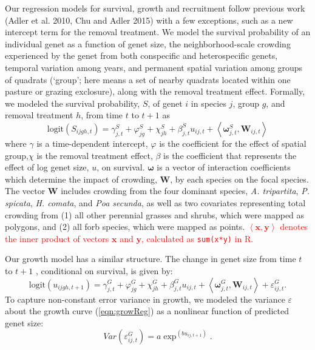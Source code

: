 \documentclass[11pt]{article}
\newcommand{\new}{\textcolor{red}}
\begin{document}
\begin{doublespacing}
Our regression models for survival, growth and recruitment follow previous work (Adler et al. 2010, Chu and Adler 2015) with a few exceptions, such as a new intercept term for the removal treatment. We model the survival probability of an individual genet as a function of genet size, the neighborhood-scale crowding experienced by the genet from both conspecific and heterospecific genets, temporal variation among years, and permanent spatial variation among groups of quadrats (`group'; here means a set of nearby quadrats located within one pasture or grazing exclosure), along with the removal treatment effect. Formally, we modeled the survival probability, $S$, of genet $i$ in species $j$, group $g$, and removal treatment $h$, from time $t$ to $t+1$  as
\begin{equation}
\mbox{logit}(S_{ijgh,t}) = \gamma_{j,t}^S + \varphi_{jg}^S+  \chi_{jh}^S  + \beta_{j,t}^S u_{ij,t} +  
\left \langle \boldsymbol{\omega}_{j,t}^S, \boldsymbol{W}_{ij,t} \right \rangle 
\label{eqn:survReg}
\end{equation}
where $\gamma$ is a time-dependent intercept, $\varphi$ is the coefficient for the effect of spatial group,$\chi$ is the removal treatment effect, $\beta$ is the coefficient that represents the effect of log genet size, $u$, on survival. $\boldsymbol{\omega}$ is a vector of interaction coefficients which determine the impact of crowding, $\boldsymbol{W}$, by each species on the focal species. The vector $\boldsymbol{W}$ includes crowding from the four dominant species,  \textit{A. tripartita}, \textit{P. spicata}, \textit{H. comata}, and \textit{Poa secunda}, as well as two covariates representing total crowding from (1) all other perennial grasses and shrubs, which were mapped as polygons, and (2) all forb species, which were mapped as points. 
\new{$\left \langle \boldsymbol{x, y} \right \rangle$ denotes the inner product of vectors $\boldsymbol{x}$ and $\boldsymbol{y}$, 
calculated as \texttt{sum(x*y)} in R.} 

Our growth model has a similar structure. The change in genet size from time $t$ to $t+1$ , conditional on survival, is given by:
\begin{equation}
\mbox{logit}(u_{ijgh,t+1}) = \gamma_{j,t}^G + \varphi_{jg}^G+  \chi_{jh}^G  + \beta_{j,t}^G u_{ij,t} + 
\left \langle  \boldsymbol{\omega}_{j,t}^G, \boldsymbol{W}_{ij,t} \right \rangle + \varepsilon_{ij,t}^G .
\label{eqn:growReg}
\end{equation}
To capture non-constant error variance in growth, we modeled the variance $\varepsilon$  about the growth curve (\ref{eqn:growReg})  as a nonlinear function of predicted genet size:
\begin{equation}
Var(\varepsilon_{ij,t}^G) = a \exp ^{(bu_{ij,t+1})} .
\label{eqn:growVar}
\end{equation}


\end{doublespacing}
\end{document}
